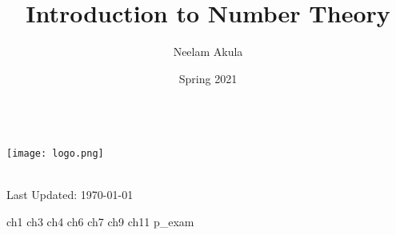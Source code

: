 \documentclass[fullpage]{article}
\title{Introduction to Number Theory}
\author{Neelam Akula}
\date{Spring 2021}
\newif\ifintro
\begin{document}
\makeatletter
    \begin{titlepage}
        \begin{center}
            {\huge \bfseries  \@title }\\[4ex]
			\texttt{[image: logo.png]}\\[4ex]
            {\large  \@author}\\[4ex] 
            {\large \@date}
        \end{center}
        \vfill
        Last Updated: \today
    \end{titlepage}
\makeatother

\setcounter{tocdepth}{2}
\tableofcontents
\newpage

\ifintro
\section*{Introduction}
\rule{\textwidth}{1pt}
\vspace{1.5in}
\paragraph{}
    This is a compilation of notes and homeworks for MATH 406,
    Introduction to Number Theory, to aid both current and future students
    in fully understanding the material. 
    The primary text used is \emph{Elementary Number Theory}, by Kenneth H. Rosen, 6th
    Edition. While the text is not required it is an excellent resource for additional
    problems. Chapters covered from the text are 1, 3, 4, 6, 7, 9, 11, and 8 in that order. With two
    midterms following chapters 1, 3, 4 and chapters 6, 7, 9. The final is cumulative with an
    emphasis on chapters 8 and 11.
    Lastly, the course is taught by Dr. Justin Wyss-Gallifent, on his personal site there are
    brief versions of each section's lecture notes. A list of his notes can be found
    \href{https://www.math.umd.edu/~immortal/MATH406/}{here}.
\addcontentsline{toc}{section}{Introduction}
\newpage
\fi

{ch1}
\newpage
{ch3}
\newpage
{ch4}
\newpage
{ch6}
\newpage
{ch7}
\newpage
{ch9}
\newpage
{ch11}
\newpage
{p_exam}
\end{document}
